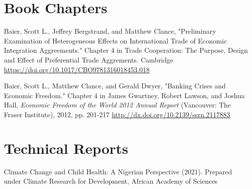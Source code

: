 \documentclass[margin,line]{res}                          %
\newenvironment{list1}{
  \begin{list}{\ding{113}}{%
      \setlength{\itemsep}{0.4em}
      \setlength{\parsep}{0in} \setlength{\parskip}{0in}
      \setlength{\topsep}{0in} \setlength{\partopsep}{0in} 
      \setlength{\leftmargin}{0.17in}}}{\end{list}}
\begin{document}
\begin{resume}
\section{\sc Book Chapters}
\begin{list1}
\item[] 
\item[] Baier, Scott L., Jeffrey Bergstrand, and Matthew Clance, "Preliminary Examination of Heterogeneous Effects on International Trade of Economic Integration Aggreements." Chapter 4 in Trade Cooperation: The Purpose, Design and Effect of Preferential Trade Aggrements. Cambridge \url{https://doi.org/10.1017/CBO9781316018453.018}
\item[] Baier, Scott L., Matthew Clance, and Gerald Dwyer, "Banking Crises and Economic Freedom." Chapter 4 in James Gwartney, Robert Lawson, and Joshua Hall, \textit{Economic Freedom of the World 2012 Annual Report} (Vancouver: The Fraser Institute), 2012, pp. 201-217 \url{http://dx.doi.org/10.2139/ssrn.2117883}
\end{list1}

\section{\sc Technical Reports}
\begin{list1}
\item[] Climate Change and Child Health: A Nigerian Perspective (2021). Prepared under Climate Research for Development, African Academy of Sciences
\end{list1}


\end{resume}
\end{document}
